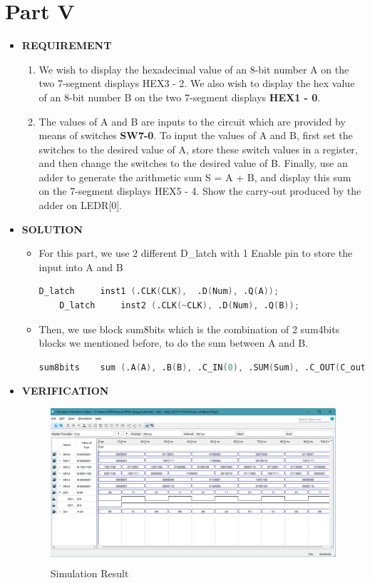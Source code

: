 
\section{Part V}
\begin{itemize}
    \item []\textbf{REQUIREMENT} 
        \begin{enumerate}
            \item We wish to display the hexadecimal value of an 8-bit number A on the two 7-segment displays HEX3 - 2. We also wish to display the hex value of an 8-bit number B on the two 7-segment displays \textbf{HEX1 - 0}. 
            \item The values of A and B are inputs to the circuit which are provided by means of switches \textbf{SW7-0}. To input the values of A and B, first set the switches to the desired value of A, store these switch values in a register, and then change the switches to the desired value of B. Finally, use an adder to generate the arithmetic sum S = A + B, and display this sum on the 7-segment displays HEX5 - 4. Show the carry-out produced by the adder on LEDR[0].
        \end{enumerate}
    \item []\textbf{SOLUTION}
        \begin{itemize}
            \item []For this part, we use 2 different D\_latch with 1 Enable pin to store the input into A and B
                \begin{lstlisting}[language = verilog]
    D_latch     inst1 (.CLK(CLK),  .D(Num), .Q(A));
    D_latch     inst2 (.CLK(~CLK), .D(Num), .Q(B));
                \end{lstlisting}
            \item []Then, we use block sum8bits which is the combination of 2 sum4bits blocks we mentioned before, to do the sum between A and B.
                \begin{lstlisting}[language = verilog]
    sum8bits	sum	(.A(A), .B(B), .C_IN(0), .SUM(Sum), .C_OUT(C_out));            \end{lstlisting}
        \end{itemize}
    \item []\textbf{VERIFICATION}
        \begin{figure}[h]
            \centering
            \includegraphics[scale = 0.5]{source/picture/lab3/lab3.png}
            \caption{Simulation Result}
        \end{figure}
\end{itemize}

